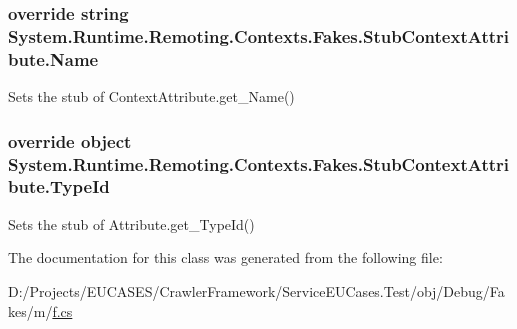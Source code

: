 \hypertarget{class_system_1_1_runtime_1_1_remoting_1_1_contexts_1_1_fakes_1_1_stub_context_attribute_ad29a027119e3cfb0ec16e986fa78b829}{
\subsubsection[{Name}]{\setlength{\rightskip}{0pt plus 5cm}override string System.\-Runtime.\-Remoting.\-Contexts.\-Fakes.\-Stub\-Context\-Attribute.\-Name\hspace{0.3cm}{\ttfamily [get]}}}\label{class_system_1_1_runtime_1_1_remoting_1_1_contexts_1_1_fakes_1_1_stub_context_attribute_ad29a027119e3cfb0ec16e986fa78b829}


Sets the stub of Context\-Attribute.\-get\-\_\-\-Name()

\hypertarget{class_system_1_1_runtime_1_1_remoting_1_1_contexts_1_1_fakes_1_1_stub_context_attribute_a145e31a6108f745a3d2d72ca0432c3a1}{
\subsubsection[{Type\-Id}]{\setlength{\rightskip}{0pt plus 5cm}override object System.\-Runtime.\-Remoting.\-Contexts.\-Fakes.\-Stub\-Context\-Attribute.\-Type\-Id\hspace{0.3cm}{\ttfamily [get]}}}\label{class_system_1_1_runtime_1_1_remoting_1_1_contexts_1_1_fakes_1_1_stub_context_attribute_a145e31a6108f745a3d2d72ca0432c3a1}


Sets the stub of Attribute.\-get\-\_\-\-Type\-Id()



The documentation for this class was generated from the following file\-:\begin{DoxyCompactItemize}
\item 
D\-:/\-Projects/\-E\-U\-C\-A\-S\-E\-S/\-Crawler\-Framework/\-Service\-E\-U\-Cases.\-Test/obj/\-Debug/\-Fakes/m/\hyperlink{m_2f_8cs}{f.\-cs}\end{DoxyCompactItemize}

